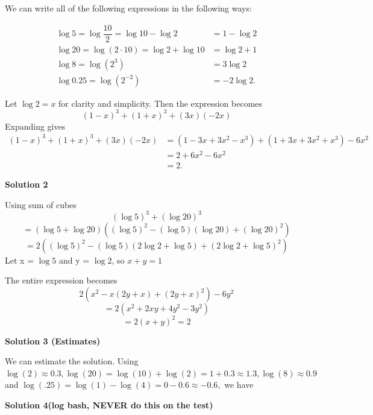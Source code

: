 \begin{enumerate}
 We can write all of the following expressions in the following ways: 

 \begin{align*}\log5=\log\dfrac{10}2=\log10-\log2&=1-\log2\\ \log20=\log(2\cdot10)=\log2+\log10&=\log2+1\\\log8=\log\left(2^3\right)&=3\log2 \\\log0.25=\log\left(2^{-2}\right)&=-2\log2.\end{align*}


 Let $\log2 = x$ for clarity and simplicity. Then the expression becomes 
 \[(1-x)^3+(1+x)^3+(3x)(-2x)\]Expanding gives\begin{align*}(1-x)^3+(1+x)^3+(3x)(-2x) &= (1-3x+3x^2-x^3) + (1+3x+3x^2+x^3) - 6x^2 \\&= 2+6x^2-6x^2 \\&= \boxed{2}.\end{align*}


 



\textbf{Solution 2}

Using sum of cubes
 \[(\log 5)^{3}+(\log 20)^{3}\]
 \[= (\log 5 + \log 20)((\log 5)^{2}-(\log 5)(\log 20) + (\log 20)^{2})\]
 \[= 2((\log 5)^{2}-(\log 5)(2\log 2 + \log 5) + (2\log 2 + \log 5)^{2})\]Let x = $\log 5$ and y = $\log 2$, so $x+y=1$

 The entire expression becomes
 \[2(x^2-x(2y+x)+(2y+x)^2)-6y^2\]
 \[=2(x^2+2xy+4y^2-3y^2)\]
 \[=2(x+y)^2 = \boxed{2}\]




\textbf{Solution 3 (Estimates)}

We can estimate the solution. Using $\log(2) \approx 0.3, \log(20) = \log(10)+\log(2) = 1 + 0.3 \approx 1.3, \log(8) \approx 0.9$ and $\log(.25) = \log(1)-\log(4)= 0 - 0.6\approx -0.6,$ we have

 



\textbf{Solution 4(log bash, NEVER do this on the test)}


\end{enumerate}
